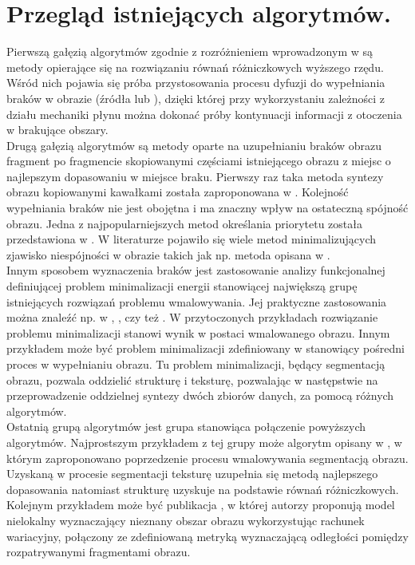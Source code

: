 \documentclass[12pt, twoside, openany]{report}
\theoremstyle{definition}
\begin{document}
\chapter{Przegląd istniejących algorytmów.}
Pierwszą gałęzią algorytmów zgodnie z rozróżnieniem wprowadzonym w  \cite{SalientStrucTexProp} są metody opierające się na rozwiązaniu równań różniczkowych wyższego rzędu. Wśród nich pojawia się próba przystosowania procesu dyfuzji do wypełniania braków w obrazie (źródła \cite{bertalmio2000image} lub \cite{BertalmioNavierStokes}), dzięki której przy wykorzystaniu zależności z działu mechaniki płynu można dokonać próby kontynuacji informacji z otoczenia w brakujące obszary. \\
Drugą gałęzią algorytmów są metody oparte na uzupełnianiu braków obrazu fragment po fragmencie skopiowanymi częściami istniejącego obrazu z miejsc o najlepszym dopasowaniu w miejsce braku. Pierwszy raz taka metoda syntezy obrazu kopiowanymi kawałkami została zaproponowana w \cite{efros1999texture}. Kolejność wypełniania braków nie jest obojętna i ma znaczny wpływ na ostateczną spójność obrazu. Jedna z najpopularniejszych metod określania priorytetu została przedstawiona w \cite{criminisi2004region}. W literaturze pojawiło się wiele metod minimalizujących zjawisko niespójności w obrazie takich jak np. metoda opisana w  \cite{StructurePropagationManual}. \\
Innym sposobem wyznaczenia braków jest zastosowanie analizy funkcjonalnej definiującej problem minimalizacji energii stanowiącej największą grupę istniejących rozwiązań problemu wmalowywania. 
Jej praktyczne zastosowania można znaleźć np. w \cite{MathematicalModelsforNLTextureInpainting}, \cite{ColorTextureInpaintingNLCTVModel}, czy też \cite{arias2011variational}. W przytoczonych przykładach rozwiązanie problemu minimalizacji stanowi wynik w postaci wmalowanego obrazu. Innym przykładem może być problem minimalizacji zdefiniowany w \cite{SalientStrucTexProp} stanowiący pośredni proces w wypełnianiu obrazu. Tu problem minimalizacji, będący segmentacją obrazu, pozwala oddzielić strukturę i teksturę, pozwalając w następstwie na przeprowadzenie oddzielnej syntezy dwóch zbiorów danych, za pomocą różnych algorytmów. \\
Ostatnią grupą algorytmów jest grupa stanowiąca połączenie powyższych algorytmów. Najprostszym przykładem z tej grupy może algorytm opisany w \cite{NavierStokesAndTexturePropagation}, w którym zaproponowano poprzedzenie procesu wmalowywania segmentacją obrazu. Uzyskaną w procesie segmentacji teksturę uzupełnia się metodą najlepszego dopasowania natomiast strukturę uzyskuje na podstawie równań różniczkowych. Kolejnym przykładem może być publikacja \cite{arias2011variational}, w której autorzy proponują model nielokalny wyznaczający nieznany obszar obrazu wykorzystując rachunek wariacyjny, połączony ze zdefiniowaną metryką wyznaczającą odległości pomiędzy rozpatrywanymi fragmentami obrazu. \\
\end{document}
